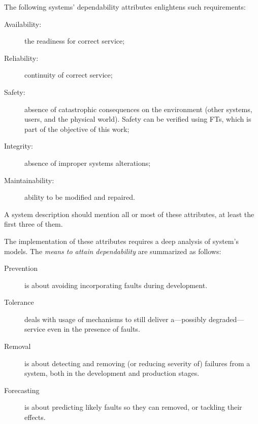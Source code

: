 \documentclass[12pt,openright,twoside,a4paper,oldfontcommands,english,brazil,final]{abntex2}
\theoremstyle{theo}
\begin{document}
The following systems' dependability attributes enlightens such requirements:
\begin{description}
  \item[Availability:] the readiness for correct service;
  \item[Reliability:] continuity of correct service;
  \item[Safety:] absence of catastrophic consequences on the environment (other systems, users, and the physical world).
  Safety can be verified using \acp{FT}, which is part of the objective of this work;
  \item[Integrity:] absence of improper systems alterations;
  \item[Maintainability:] ability to be modified and repaired.
\end{description}
%
A system description should mention all or most of these attributes, at least the first three of them.

The implementation of these attributes requires a deep analysis of system's models.
The \emph{means to attain dependability} are summarized as follows:

\begin{description}
  \item[Prevention] is about avoiding incorporating faults during development.
  \item[Tolerance] deals with usage of mechanisms to still deliver a---possibly degraded---service even in the presence of faults.
  \item[Removal] is about detecting and removing (or reducing severity of) failures from a system, both in the development and production stages.
  \item[Forecasting] is about predicting likely faults so they can removed, or tackling their effects.
\end{description}
\end{document}
